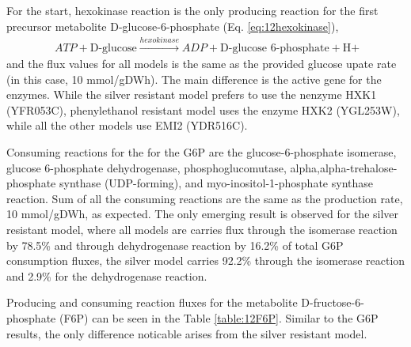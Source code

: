 For the start, hexokinase reaction is the only producing reaction for the first precursor metabolite D-glucose-6-phosphate (Eq. \ref{eq:12hexokinase}),
\begin{align}
\label{eq:12hexokinase}
\ ATP + \text{D-glucose} \xrightarrow{hexokinase} ADP + \text{D-glucose 6-phosphate} + \text{H+}
\end{align}
and the flux values for all models is the same as the provided glucose upate rate (in this case, 10 mmol/gDWh). The main difference is the active gene for the enzymes. While the silver resistant model prefers to use the nenzyme HXK1 (YFR053C), phenylethanol resistant model uses the enzyme HXK2 (YGL253W), while all the other models use EMI2 (YDR516C).

Consuming reactions for the for the G6P are the glucose-6-phosphate isomerase, glucose 6-phosphate dehydrogenase, phosphoglucomutase, alpha,alpha-trehalose-phosphate synthase (UDP-forming), and myo-inositol-1-phosphate synthase reaction. Sum of all the consuming reactions are the same as the production rate, 10 mmol/gDWh, as expected. The only emerging result is observed for the silver resistant model, where all models are carries flux through the isomerase reaction by 78.5\% and through dehydrogenase reaction by 16.2\% of total G6P consumption fluxes, the silver model carries 92.2\% through the isomerase reaction and 2.9\% for the dehydrogenase reaction.

Producing and consuming reaction fluxes for the metabolite D-fructose-6-phosphate (F6P) can be seen in the Table \ref{table:12F6P}. Similar to the G6P results, the only difference noticable arises from the silver resistant model.

